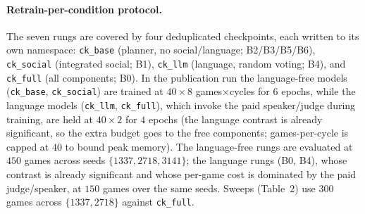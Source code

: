 \documentclass[11pt]{article}
\begin{document}
\paragraph{Retrain-per-condition protocol.} The seven rungs are covered by four
deduplicated checkpoints, each written to its own namespace:
\texttt{ck\_base} (planner, no social/language; B2/B3/B5/B6),
\texttt{ck\_social} (integrated social; B1),
\texttt{ck\_llm} (language, random voting; B4), and
\texttt{ck\_full} (all components; B0). In the publication run the language-free
models (\texttt{ck\_base}, \texttt{ck\_social}) are trained at $40\times8$
games$\times$cycles for $6$ epochs, while the language models
(\texttt{ck\_llm}, \texttt{ck\_full}), which invoke the paid speaker/judge during
training, are held at $40\times2$ for $4$ epochs (the language contrast is already
significant, so the extra budget goes to the free components; games-per-cycle is
capped at $40$ to bound peak memory). The language-free rungs are evaluated at
$450$ games across seeds $\{1337, 2718, 3141\}$; the language rungs (B0, B4), whose
contrast is already significant and whose per-game cost is dominated by the paid
judge/speaker, at $150$ games over the same seeds. Sweeps (Table~2) use $300$ games
across $\{1337, 2718\}$ against \texttt{ck\_full}.



\end{document}
